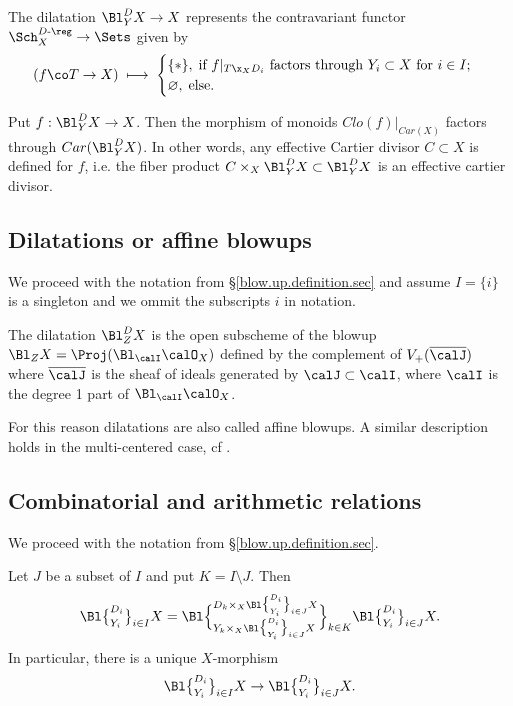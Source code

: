 \documentclass[10pt]{alggeom}
\theoremstyle{definition}
\numberwithin{equation}{section}
\begin{document}
 \label{blow.up.rep.prop}
The dilatation $\Bl_Y^DX\to X$ represents the contravariant functor $\Sch_X^{D\text{-}\reg}\to \Sets$ given by
\begin{equation}\label{blow.up.iso.eq}
(f\co T\to X) \;\longmapsto\; \begin{cases}\{*\}, \; \text{if $f|_{T\x_XD_i}$ factors through $Y_i\subset X$ for $i \in I$;}\\ \varnothing,\;\text{else.}\end{cases}
\end{equation}
\xprop




\prop[{\cite{Ma23d}}] \label{defined} Put $f : \Bl_Y ^D X \to X$. Then the morphism of monoids $Clo (f) |_{Car(X)} $ factors through $Car( \Bl_Y ^D X )$. In other words, any effective Cartier divisor $C \subset X$ is defined for $f$, i.e. the fiber product $C \times _X \Bl_{Y}^D X \subset \Bl_{Y}^D X $ is an effective cartier divisor.\xprop

\subsection{Dilatations or affine blowups }

We proceed with the notation from \S\ref{blow.up.definition.sec} and assume $I= \{i\}$ is a singleton and we ommit the subscripts $i$ in notation.

 \label{blow.up.open.lemm}
The dilatation $\Bl_Z^DX$ is the open subscheme of the blowup $\Bl_ZX=\Proj(\Bl_\calI\calO_X)$ defined by the complement of $V_+(\overline\calJ)$ where $\overline\calJ$
is the sheaf of ideals generated by $\calJ\subset\calI$, where $\calI$
is the degree 1 part of $\Bl_\calI\calO_X$.
\xprop

For this reason dilatations are also called affine blowups.
 A similar description holds in the multi-centered case, cf \cite{Ma23d}.

\subsection{Combinatorial and arithmetic  relations}
We proceed with the notation from \S\ref{blow.up.definition.sec}.




\prop[{\cite{Ma23d}}] \label{multietape} Let $J $ be a subset of $I$ and put $K = I \setminus J$. Then
\[ \Bl \big\{_{Y_i} ^{D_i}\big\}_{i \in I} X = \Bl \Big\{_{Y_k \times _X  \Bl \big\{_{Y_i}^{D_i}\big\}_{i \in J} X } ^{
D_k \times _X  \Bl \big\{_{Y_i}^{D_i}\big\}_{i \in J} X  }\Big\} _{k \in K } \Bl \big\{_{Y_i}^{D_i}\big\}_{i \in J} X  .\] In particular, there is a unique $X$-morphism \[\Bl \big\{_{Y_i}^{D_i}\big\}_{i \in I} X  \to \Bl \big\{_{Y_i}^{D_i}\big\}_{i \in J} X . \]
\xprop 
\end{document}
